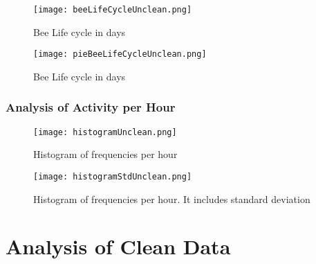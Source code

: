 \documentclass[11pt,fleqn]{book} %
\begin{document}
%


\begin{figure}[h!]%
\centering%
\texttt{[image: beeLifeCycleUnclean.png]}%
\caption{Bee Life cycle in days}%
\end{figure}

%


\begin{figure}[h!]%
\centering%
\texttt{[image: pieBeeLifeCycleUnclean.png]}%
\caption{Bee Life cycle in days}%
\end{figure}

%
\subsection*{Analysis of Activity per Hour}%


\begin{figure}[h!]%
\centering%
\texttt{[image: histogramUnclean.png]}%
\caption{Histogram of frequencies per hour}%
\end{figure}

%


\begin{figure}[h!]%
\centering%
\texttt{[image: histogramStdUnclean.png]}%
\caption{Histogram of frequencies per hour. It includes standard deviation}%
\end{figure}


\chapter{Analysis of Clean Data}
\end{document}
